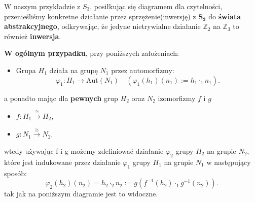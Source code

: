 \begin{summary}

	W naszym przykładzie z $S_3$, posiłkując się diagramem dla czytelności, przenieśliśmy konkretne działanie przez sprzężenie(inwersję) z $\bm{ S_3 } $ do \textbf{świata abstrakcyjnego}, odkrywając, że jedyne nietrywialne działanie $\mathbb{Z}_2$ na $\mathbb{Z}_3$ to również \textbf{inwersja}. 

\textbf{W ogólnym przypadku}, przy poniższych założeniach:
\begin{itemize}
	\item Grupa $H_1$ działa na grupę $N_1$ przez automorfizmy:
		\[
		\varphi_1: H_1\rightarrow\text{Aut}\left( N_1 \right) \quad \left( \varphi_1\left( h_1 \right) \left( n_1 \right) := h_1\cdot _{1} n_1 \right) 
		.\]
	\end{itemize}

	a ponadto mając dla \textbf{pewnych} grup $H_2$ oraz $N_2$ izomorfizmy $f$ i $g$
	\begin{itemize}
		\item $f: H_1 \overset{\cong}{\rightarrow} H_2$,
		\item $g: N_1 \overset{\cong}{\rightarrow} N_2$.
	\end{itemize}

wtedy używając f i g możemy zdefiniować działanie $\varphi_2$ grupy $H_2$ na grupie $N_2$, które jest indukowane przez działanie $\varphi_1$ grupy $H_1$ na grupie $N_1$ w następujący sposób:
\[
\varphi_2\left( h_2 \right) \left( n_2 \right) = h_2\cdot _{2}n_2 := g\left( f^{-1}(h_2)\cdot _{1}g^{-1}\left( n_2 \right) \right) 
.\] 
tak jak na poniższym diagramie jest to widoczne.
\begin{figure}[H]
\centering
{}
\end{figure}
\end{summary}
